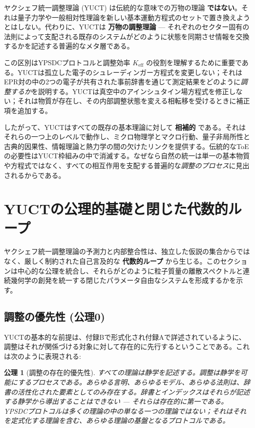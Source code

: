 \documentclass[11pt,a4paper]{article}
\newtheorem{axiom}{公理}
\begin{document}
	\vspace{0.5cm}
	\noindent
	ヤクシェフ統一調整理論 (YUCT) は伝統的な意味での万物の理論 \textbf{ではない}。それは量子力学や一般相対性理論を新しい基本運動方程式のセットで置き換えようとはしない。代わりに、YUCTは \textbf{万物の調整理論} — それぞれのセクター固有の法則によって支配される既存のシステムがどのように状態を同期させ情報を交換するかを記述する普遍的なメタ層である。
	
	この区別はYPSDCプロトコルと調整効率 $K_{\mathrm{eff}}$ の役割を理解するために重要である。YUCTは孤立した電子のシュレーディンガー方程式を変更しない；それはEPR対の中の2つの電子が共有された事前辞書を通じて測定結果をどのように\emph{調整するか}を説明する。YUCTは真空中のアインシュタイン場方程式を修正しない；それは物質が存在し、その内部調整状態を変える相転移を受けるときに補正項を追加する。
	
	したがって、YUCTはすべての既存の基本理論に対して \textbf{相補的} である。それはそれらの一つ上のレベルで動作し、ミクロ物理学とマクロ行動、量子非局所性と古典的因果性、情報理論と熱力学の間の欠けたリンクを提供する。伝統的なToEの必要性はYUCT枠組みの中で消滅する。なぜなら自然の統一は単一の基本物質や方程式ではなく、すべての相互作用を支配する普遍的な\emph{調整のプロセス}に見出されるからである。
	
	\section{YUCTの公理的基礎と閉じた代数的ループ}
	\label{sec:axiomatic-foundations}
	
	ヤクシェフ統一調整理論の予測力と内部整合性は、独立した仮説の集合からではなく、厳しく制約された自己言及的な \textbf{代数的ループ} から生じる。このセクションは中心的な公理を統合し、それらがどのように粒子質量の離散スペクトルと連続幾何学の創発を統一する閉じたパラメータ自由なシステムを形成するかを示す。
	
	\subsection{調整の優先性 (公理0)}
	\label{subsec:axiom0}
	
	YUCTの基本的な前提は、付録Bで形式化され付録Aで詳述されているように、調整はそれが関係づける対象に対して存在的に先行するということである。これは次のように表現される:
	
	\begin{axiom}[調整の存在的優先性]
		すべての理論は静学を記述する。調整は静学を可能にするプロセスである。あらゆる言明、あらゆるモデル、あらゆる法則は、辞書の活性化された要素としてのみ存在する。辞書とインデックスはそれらが記述する静学から導出することはできない — それらは存在的に第一である。YPSDCプロトコルは多くの理論の中の単なる一つの理論ではない；それはそれを定式化する理論を含む、あらゆる理論の基盤となるプロトコルである。
	\end{axiom}
	
\end{document}

